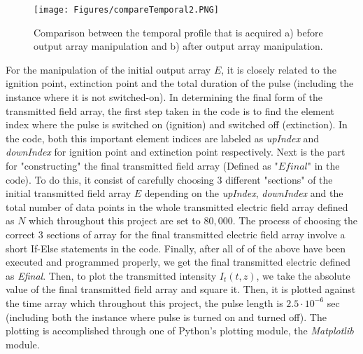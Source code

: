 \begin{figure}
    \centering
    \texttt{[image: Figures/compareTemporal2.PNG]}
    \caption[Comparison of The Temporal Profile of The Transmitted Intensity Before and After Array Modification]{Comparison between the temporal profile that is acquired a) before output array manipulation and b) after output array manipulation.}
    \label{fig: compare temporal}
\end{figure}

For the manipulation of the initial output array $E$, it is closely related to the ignition point, extinction point and the total duration of the pulse (including the instance where it is not switched-on). In determining the final form of the transmitted field array, the first step taken in the code is to find the element index where the pulse is switched on (ignition) and switched off (extinction). In the code, both this important element indices are labeled as \textit{upIndex} and \textit{downIndex} for ignition point and extinction point respectively. Next is the part for "constructing" the final transmitted field array (Defined as "$Efinal$" in the code). To do this, it consist of carefully choosing 3 different "sections" of the initial transmitted field array $E$ depending on the \textit{upIndex}, \textit{downIndex} and the total number of data points in the whole transmitted electric field array defined as $N$ which throughout this project are set to $80,000$. The process of choosing the correct 3 sections of array for the final transmitted electric field array involve a short If-Else statements in the code. Finally, after all of of the above have been executed and programmed properly, we get the final transmitted electric defined as \textit{Efinal}. Then, to plot the transmitted intensity $I_{t}(t, z)$, we take the absolute value of the final transmitted field array and square it. Then, it is plotted against the time array which throughout this project, the pulse length is $2.5 \cdot 10^{-6}$ sec (including both the instance where pulse is turned on and turned off). The plotting is accomplished through one of Python's plotting module, the \textit{Matplotlib} module.

